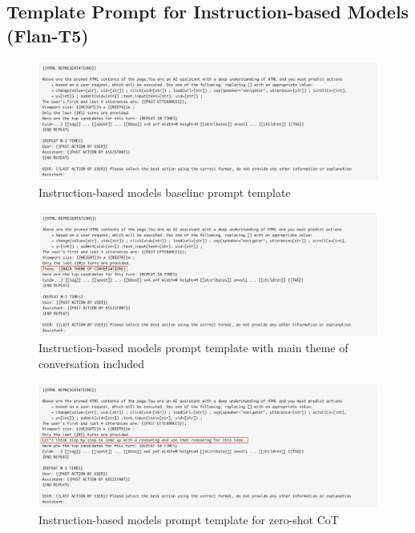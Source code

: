 \documentclass[11pt]{article}
\begin{document}
\clearpage

\subsection{Template Prompt for Instruction-based Models (Flan-T5)}

\begin{figure}[ht]
\includegraphics[width=\textwidth]{prompts/Instruct-base-template.png}
\caption{Instruction-based models baseline prompt template}\label{fig:fig5}
\centering
\end{figure}


\begin{figure}[ht]
\includegraphics[width=\textwidth]{prompts/Instruct-history-template.png}
\caption{Instruction-based models prompt template with main theme of conversation included}\label{fig:fig6}
\centering
\end{figure}

\clearpage
\begin{figure}[ht]
\includegraphics[width=\textwidth]{prompts/Instruct-zero-shot-template.png}
\caption{Instruction-based models prompt template for zero-shot CoT}\label{fig:fig7}
\centering
\end{figure}
\end{document}
